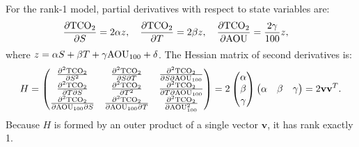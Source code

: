 For the rank-1 model, partial derivatives with respect to state variables are:
\begin{align}
\frac{\partial \mathrm{TCO_2}}{\partial S} &= 2 \alpha z, \quad \frac{\partial \mathrm{TCO_2}}{\partial T} = 2 \beta z, \quad \frac{\partial \mathrm{TCO_2}}{\partial \mathrm{AOU}} = \frac{2 \gamma}{100} z,
\end{align}
where $z = \alpha S + \beta T + \gamma \mathrm{AOU}_{100} + \delta$. The Hessian matrix of second derivatives is:
\begin{equation}
H = \begin{pmatrix}
\frac{\partial^2 \mathrm{TCO_2}}{\partial S^2} & \frac{\partial^2 \mathrm{TCO_2}}{\partial S \partial T} & \frac{\partial^2 \mathrm{TCO_2}}{\partial S \partial \mathrm{AOU}_{100}} \\
\frac{\partial^2 \mathrm{TCO_2}}{\partial T \partial S} & \frac{\partial^2 \mathrm{TCO_2}}{\partial T^2} & \frac{\partial^2 \mathrm{TCO_2}}{\partial T \partial \mathrm{AOU}_{100}} \\
\frac{\partial^2 \mathrm{TCO_2}}{\partial \mathrm{AOU}_{100} \partial S} & \frac{\partial^2 \mathrm{TCO_2}}{\partial \mathrm{AOU}_{100} \partial T} & \frac{\partial^2 \mathrm{TCO_2}}{\partial \mathrm{AOU}_{100}^2}
\end{pmatrix} = 2 \begin{pmatrix} \alpha \\ \beta \\ \gamma \end{pmatrix} \begin{pmatrix} \alpha & \beta & \gamma \end{pmatrix} = 2 \mathbf{v} \mathbf{v}^T.
\end{equation}
Because $H$ is formed by an outer product of a single vector $\mathbf{v}$, it has rank exactly 1.
